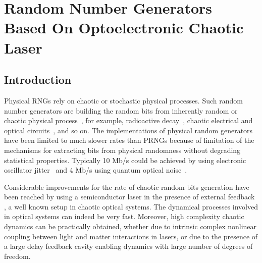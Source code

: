 \part{Random Number Generators Based On Optoelectronic Chaotic Laser}
\label{Optoelectronic Chaotic Laser}
\chapter{Introduction}
\label{chaotic laser introdution}

Physical RNGs rely on chaotic or stochastic physical processes. Such random number generators are building the random bits from inherently random or chaotic physical process~\cite{security}, for example, radioactive decay~\cite{radio}, chaotic electrical and optical circuits~\cite{circuits}, and so on. The implementations of physical random generators have been limited to much slower rates than PRNGs because of limitation of the mechanisms for extracting bits from physical randomness without degrading statistical properties. Typically 10 Mb/s could be achieved by using electronic oscillator jitter~\cite{oscillator} and 4 Mb/s using quantum optical noise~\cite{dynes:031109}.

Considerable improvements for the rate of chaotic random bits generation have been reached by using a semiconductor laser in the presence of external feedback \cite{mukai85}, a well known setup in chaotic optical systems. The dynamical processes involved in optical systems can indeed be very fast. Moreover, high complexity chaotic dynamics can be practically obtained, whether due to intrinsic complex nonlinear coupling between light and matter interactions in lasers, or due to the presence of a large delay feedback cavity enabling dynamics with large number of degrees of freedom. 

